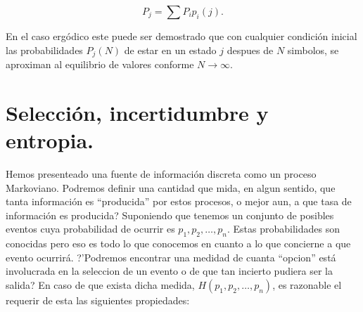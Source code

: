 \begin{equation}
P_{j} = \sum P_{i}p_{i}(j).
\end{equation}

En el caso erg\'{o}dico este puede ser demostrado que con cualquier condici\'{o}n inicial las
probabilidades $P_{j}(N)$ de estar en un estado $j$ despues de $N$ simbolos, se aproximan al
equilibrio de valores conforme $N \rightarrow \infty$.

\section{Selecci\'{o}n, incertidumbre y entropia.}

Hemos presenteado una fuente de informaci\'{o}n discreta como un
proceso Markoviano. Podremos definir una cantidad que mida, en algun
sentido, que tanta informaci\'{o}n es ``producida'' por estos
procesos, o mejor aun, a que tasa de informaci\'{o}n es producida?
Suponiendo que tenemos un conjunto de posibles eventos cuya
probabilidad de ocurrir es $p_{1}, p_{2}, \ldots, p_{n}$. Estas
probabilidades son conocidas pero eso es todo lo que conocemos en
cuanto a lo que concierne a que evento ocurrir\'{a}. ?'Podremos
encontrar una medidad de cuanta ``opcion'' est\'{a} involucrada en la
seleccion de un evento o de que tan incierto pudiera ser la salida?
En caso de que exista dicha medida, $H(p_{1}, p_{2}, \ldots, p_{n})$,
es razonable el requerir de esta las siguientes propiedades:

